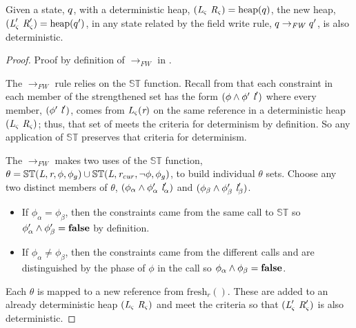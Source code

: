 \begin{lemma}
\label{lem:FW-determ}
Given a state, $q$, with a deterministic heap,
$(\emph{L}_{\varsigma}\ \emph{R}_{\varsigma}) =
\mathrm{heap}(q)$, the new heap,
$(\emph{L}_{\varsigma}^\prime\ \emph{R}_{\varsigma}^\prime) =
\mathrm{heap}(q^\prime)$, in any state related by the field
write rule, $q \rightarrow_\mathit{FW} q^\prime$,
is also deterministic.
\end{lemma}
\begin{proof}
Proof by definition of $\rightarrow_\mathit{FW}$ in .

The $\rightarrow_\mathit{FW}$ rule relies on the $\mathbb{ST}$
function. Recall from  that each constraint in each
member of the strengthened set has the form $(\phi\wedge
\phi^\prime\ \emph{l}^\prime)$ where every member,
$(\phi^\prime\ \emph{l}^\prime)$, comes from
$\emph{L}_{\varsigma}(\emph{r})$ on the same reference in a
deterministic heap $(\emph{L}_{\varsigma}\ \emph{R}_{\varsigma})$; thus,
that set of meets the criteria for determinism by definition. So any
application of $\mathbb{ST}$ preserves that criteria for determinism.

The $\rightarrow_\mathit{FW}$ makes two uses of the $\mathbb{ST}$
function, $\theta = \mathbb{ST}(\emph{L},\emph{r},\phi,\phi_g) \cup
\mathbb{ST}(\emph{L},\emph{r}_\mathit{cur},\neg\phi,\phi_g)$, to
build individual $\theta$ sets. Choose any two distinct members of $\theta$,
$(\phi_\alpha \wedge \phi_\alpha^\prime\ \cfgnt{l}_\alpha^\prime)$ and
$(\phi_\beta \wedge \phi_\beta^\prime\ \cfgnt{l}_\beta^\prime)$.
\begin{itemize}
\item If $\phi_\alpha = \phi_\beta$, then the constraints came from the
  same call to $\mathbb{ST}$ so $\phi_\alpha^\prime \wedge
  \phi_\beta^\prime = \textbf{false}$ by definition.
\item If $\phi_\alpha \ne \phi_\beta$, then the constraints came from
  the different calls and are distinguished by the phase of $\phi$ in
  the call so $\phi_\alpha \wedge \phi_\beta = \textbf{false}$.
\end{itemize}
Each $\theta$ is mapped to a new reference from
$\mathrm{fresh}_r()$. These are added to an already deterministic heap
$(\emph{L}_{\varsigma}\ \emph{R}_{\varsigma})$ and meet the criteria so
that $(\cfgnt{L}_\sym^\prime\ \cfgnt{R}_\sym^\prime)$ is also
deterministic.
\end{proof}

